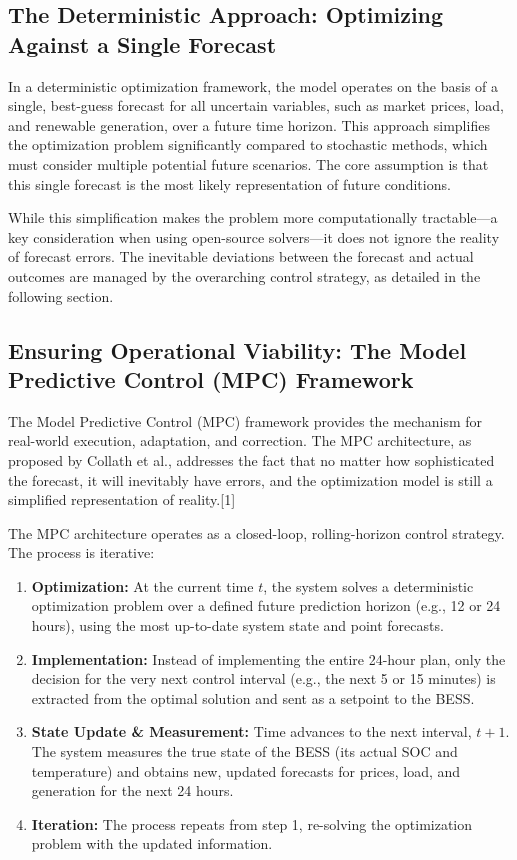 \subsection{The Deterministic Approach: Optimizing Against a Single Forecast}

In a deterministic optimization framework, the model operates on the basis of a single, best-guess forecast for all uncertain variables, such as market prices, load, and renewable generation, over a future time horizon. This approach simplifies the optimization problem significantly compared to stochastic methods, which must consider multiple potential future scenarios. The core assumption is that this single forecast is the most likely representation of future conditions.

While this simplification makes the problem more computationally tractable—a key consideration when using open-source solvers—it does not ignore the reality of forecast errors. The inevitable deviations between the forecast and actual outcomes are managed by the overarching control strategy, as detailed in the following section.

\subsection{Ensuring Operational Viability: The Model Predictive Control (MPC) Framework}

The Model Predictive Control (MPC) framework provides the mechanism for real-world execution, adaptation, and correction. The MPC architecture, as proposed by Collath et al., addresses the fact that no matter how sophisticated the forecast, it will inevitably have errors, and the optimization model is still a simplified representation of reality.[1]

The MPC architecture operates as a closed-loop, rolling-horizon control strategy. The process is iterative:
\begin{enumerate}
    \item \textbf{Optimization:} At the current time $t$, the system solves a deterministic optimization problem over a defined future prediction horizon (e.g., 12 or 24 hours), using the most up-to-date system state and point forecasts.
    \item \textbf{Implementation:} Instead of implementing the entire 24-hour plan, only the decision for the very next control interval (e.g., the next 5 or 15 minutes) is extracted from the optimal solution and sent as a setpoint to the BESS.
    \item \textbf{State Update \& Measurement:} Time advances to the next interval, $t+1$. The system measures the true state of the BESS (its actual SOC and temperature) and obtains new, updated forecasts for prices, load, and generation for the next 24 hours.
    \item \textbf{Iteration:} The process repeats from step 1, re-solving the optimization problem with the updated information.
\end{enumerate}

